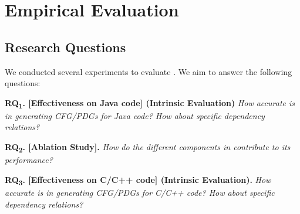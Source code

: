\section{Empirical Evaluation}
\label{sec:eval}

\subsection{Research Questions}

We conducted several experiments to evaluate {\tool}. We aim to
answer the following questions:

\vspace{2pt}

\noindent \textbf{RQ\textsubscript{1}. [Effectiveness on Java code]
  (Intrinsic Evaluation)} {\em How accurate is {\tool} in generating CFG/PDGs for Java code? How about specific dependency relations?}
  


\vspace{2pt}
\noindent \textbf{RQ\textsubscript{2}. [Ablation Study].} {\em How do
  the different components in \tool contribute to its performance?}


\vspace{2pt}
\noindent \textbf{RQ\textsubscript{3}. [Effectiveness on C/C++ code]
(Intrinsic Evaluation).}  {\em How accurate is {\tool} in generating CFG/PDGs for C/C++ code? How about specific dependency relations?}


